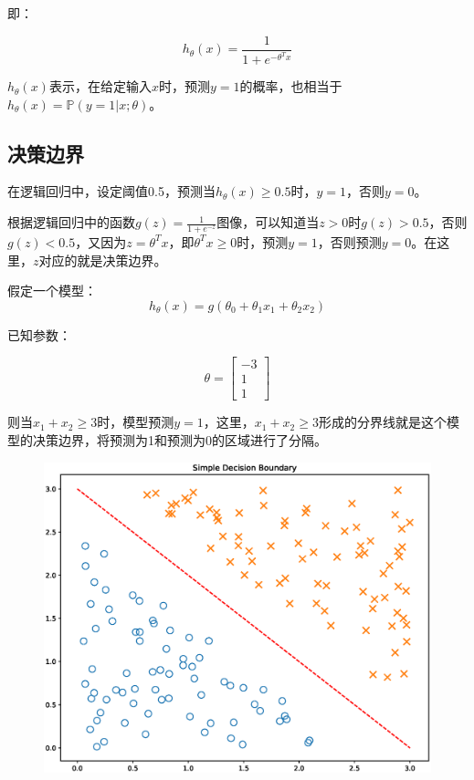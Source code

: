 \documentclass[12pt, a4paper]{article}
\begin{document}
即：

\begin{equation*}
    h_\theta(x)=\frac{1}{1+e^{-\theta^Tx}}
\end{equation*}

$h_\theta(x)$表示，在给定输入$x$时，预测$y=1$的概率，也相当于$h_\theta(x)=\mathbb{P}(y=1|x; \theta)$。

\subsection{决策边界}

在逻辑回归中，设定阈值0.5，预测当$h_\theta(x)\geq 0.5$时，$y=1$，否则$y=0$。

根据逻辑回归中的函数$g(z)=\frac{1}{1+e^{-z}}$图像，可以知道当$z>0$时$g(z)>0.5$，否则$g(z)<0.5$，又因为$z=\theta^Tx$，即$\theta^Tx\geq 0$时，预测$y=1$，否则预测$y=0$。在这里，$z$对应的就是决策边界。

假定一个模型：
\begin{equation*}
    h_\theta(x)=g(\theta_0+\theta_1x_1+\theta_2x_2)
\end{equation*}

已知参数：

\begin{equation*}
    \theta=
    \begin{bmatrix}
        -3 \\
        1  \\
        1
    \end{bmatrix}
\end{equation*}

则当$x_1+x_2\geq 3$时，模型预测$y=1$，这里，$x_1+x_2\geq 3$形成的分界线就是这个模型的决策边界，将预测为1和预测为0的区域进行了分隔。

\begin{figure}[H]
    \includegraphics[width=1\textwidth]{SimpleDecisionBoundary.eps}
\end{figure}
\end{document}
